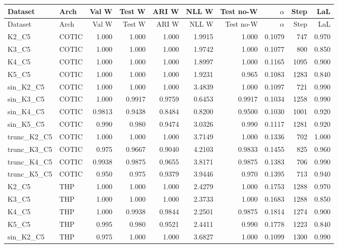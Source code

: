 \documentclass[11pt,a4paper]{article}
\begin{document}
\begin{landscape}
\scriptsize
\begin{longtable}{llrrrrrrrr}
\toprule
Dataset & Arch & Val W & Test W & ARI W & NLL W & Test no-W & $\alpha$ & Step & LaL \\
\midrule
\endfirsthead
\toprule
Dataset & Arch & Val W & Test W & ARI W & NLL W & Test no-W & $\alpha$ & Step & LaL \\
\midrule
\endhead
K2\_C5 & COTIC & 1.000 & 1.000 & 1.000 & 1.9915 & 1.000 & 0.1079 & 747 & 0.970 \\
K3\_C5 & COTIC & 1.000 & 1.000 & 1.000 & 1.9742 & 1.000 & 0.1077 & 800 & 0.850 \\
K4\_C5 & COTIC & 1.000 & 1.000 & 1.000 & 1.8997 & 1.000 & 0.1165 & 1095 & 0.900 \\
K5\_C5 & COTIC & 1.000 & 1.000 & 1.000 & 1.9231 & 0.965 & 0.1083 & 1283 & 0.840 \\
sin\_K2\_C5 & COTIC & 1.000 & 1.000 & 1.000 & 3.4839 & 1.000 & 0.1097 & 721 & 0.990 \\
sin\_K3\_C5 & COTIC & 1.000 & 0.9917 & 0.9759 & 0.6453 & 0.9917 & 0.1034 & 1258 & 0.990 \\
sin\_K4\_C5 & COTIC & 0.9813 & 0.9438 & 0.8484 & 0.8200 & 0.9500 & 0.1030 & 1001 & 0.920 \\
sin\_K5\_C5 & COTIC & 0.990 & 0.980 & 0.9474 & 3.0326 & 0.990 & 0.1117 & 1281 & 0.920 \\
trunc\_K2\_C5 & COTIC & 1.000 & 1.000 & 1.000 & 3.7149 & 1.000 & 0.1336 & 702 & 1.000 \\
trunc\_K3\_C5 & COTIC & 0.975 & 0.9667 & 0.9040 & 4.2103 & 0.9833 & 0.1455 & 825 & 0.960 \\
trunc\_K4\_C5 & COTIC & 0.9938 & 0.9875 & 0.9655 & 3.8171 & 0.9875 & 0.1383 & 706 & 0.990 \\
trunc\_K5\_C5 & COTIC & 0.950 & 0.975 & 0.9379 & 3.9446 & 0.970 & 0.1395 & 713 & 0.940 \\
\midrule
K2\_C5 & THP & 1.000 & 1.000 & 1.000 & 2.4279 & 1.000 & 0.1753 & 1288 & 0.970 \\
K3\_C5 & THP & 1.000 & 1.000 & 1.000 & 2.3733 & 1.000 & 0.1683 & 1288 & 0.850 \\
K4\_C5 & THP & 1.000 & 0.9938 & 0.9844 & 2.2501 & 0.9875 & 0.1814 & 1274 & 0.900 \\
K5\_C5 & THP & 0.995 & 0.980 & 0.9521 & 2.4411 & 0.990 & 0.1778 & 1223 & 0.840 \\
sin\_K2\_C5 & THP & 0.975 & 1.000 & 1.000 & 3.6827 & 1.000 & 0.1099 & 1300 & 0.990 \\

\end{longtable}
\end{landscape}
\end{document}
